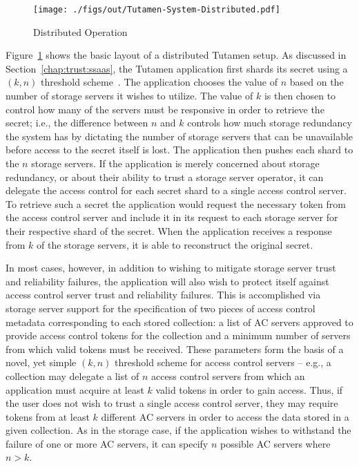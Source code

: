 \begin{figure}[t]
  \centering
  \texttt{[image: ./figs/out/Tutamen-System-Distributed.pdf]}
  \caption{Distributed Operation}
  \label{fig:tutamen:systemdistributed}
\end{figure}

Figure~\ref{fig:tutamen:systemdistributed} shows the basic layout of a
distributed Tutamen setup. As discussed in
Section~\ref{chap:trust:ssaas}, the Tutamen application first shards
its secret using a $(k, n)$ threshold scheme~\cite{krawczyk1993,
  shamir1979}. The application chooses the value of $n$ based on the
number of storage servers it wishes to utilize. The value of $k$ is
then chosen to control how many of the servers must be responsive in
order to retrieve the secret; i.e., the difference between $n$ and $k$
controls how much storage redundancy the system has by dictating the
number of storage servers that can be unavailable before access to the
secret itself is lost. The application then pushes each shard to the
$n$ storage servers. If the application is merely concerned about
storage redundancy, or about their ability to trust a storage server
operator, it can delegate the access control for each secret shard to
a single access control server. To retrieve such a secret the
application would request the necessary token from the access control
server and include it in its request to each storage server for their
respective shard of the secret. When the application receives a
response from $k$ of the storage servers, it is able to reconstruct
the original secret.

In most cases, however, in addition to wishing to mitigate storage
server trust and reliability failures, the application will also wish
to protect itself against access control server trust and reliability
failures. This is accomplished via storage server support for the
specification of two pieces of access control metadata corresponding
to each stored collection: a list of AC servers approved to provide
access control tokens for the collection and a minimum number of
servers from which valid tokens must be received. These parameters
form the basis of a novel, yet simple $(k, n)$ threshold scheme for
access control servers -- e.g., a collection may delegate a list of
$n$ access control servers from which an application must acquire at
least $k$ valid tokens in order to gain access. Thus, if the user does
not wish to trust a single access control server, they may require
tokens from at least $k$ different AC servers in order to access the
data stored in a given collection. As in the storage case, if the
application wishes to withstand the failure of one or more AC servers,
it can specify $n$ possible AC servers where $n > k$.

